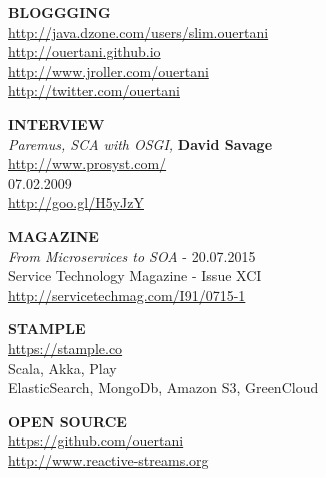 \documentclass[10pt,a4paper]{article}
\begin{document}
\begin{multicols}{2}
{\bf  BLOGGGING } \\                                   
\url{http://java.dzone.com/users/slim.ouertani}  \\          
\url{http://ouertani.github.io}     \\                     
\url{http://www.jroller.com/ouertani}  \\                    
\url{http://twitter.com/ouertani}                         

\columnbreak
{\bf INTERVIEW } \\
{\sl Paremus, SCA with OSGI,} {\bf David Savage}  \\
\url{http://www.prosyst.com/} \\
07.02.2009 \\
\url{http://goo.gl/H5yJzY}
\end{multicols}


\begin{multicols}{2}
{\bf  MAGAZINE} \\
{\sl From Microservices to SOA} -  20.07.2015 \\
Service Technology Magazine     -  Issue XCI \\
\url{http://servicetechmag.com/I91/0715-1}  \\

\columnbreak

{\bf STAMPLE } \\
\url{https://stample.co}\\
Scala, Akka, Play \\
ElasticSearch, MongoDb, Amazon S3, GreenCloud
\end{multicols}


{\bf  OPEN SOURCE } \\
\url{https://github.com/ouertani}  \\
\url{http://www.reactive-streams.org}


\spacedhrule{0em}{-0.4em}

\end{document}
